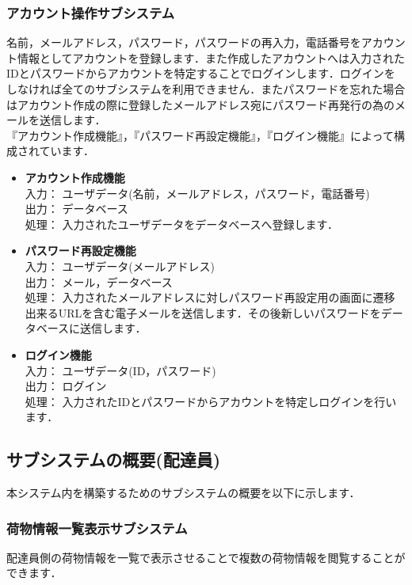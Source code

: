 \documentclass[a4j,titlepage]{jarticle}
\begin{document}
\subsubsection{アカウント操作サブシステム}
名前，メールアドレス，パスワード，パスワードの再入力，電話番号をアカウント情報としてアカウントを登録します．また作成したアカウントへは入力されたIDとパスワードからアカウントを特定することでログインします．ログインをしなければ全てのサブシステムを利用できません．またパスワードを忘れた場合はアカウント作成の際に登録したメールアドレス宛にパスワード再発行の為のメールを送信します． \\
『アカウント作成機能』，『パスワード再設定機能』，『ログイン機能』によって構成されています．

\begin{itemize}
\item \textbf{アカウント作成機能} \\
入力： ユーザデータ(名前，メールアドレス，パスワード，電話番号) \\
出力： データベース \\
処理： 入力されたユーザデータをデータベースへ登録します．
\item \textbf{パスワード再設定機能} \\
入力： ユーザデータ(メールアドレス) \\
出力： メール，データベース \\
処理： 入力されたメールアドレスに対しパスワード再設定用の画面に遷移出来るURLを含む電子メールを送信します．その後新しいパスワードをデータベースに送信します．
\item \textbf{ログイン機能} \\
入力： ユーザデータ(ID，パスワード) \\
出力： ログイン \\
処理： 入力されたIDとパスワードからアカウントを特定しログインを行います．
\end{itemize}

\newpage

\subsection{サブシステムの概要(配達員)}
本システム内を構築するためのサブシステムの概要を以下に示します．

\subsubsection{荷物情報一覧表示サブシステム}
配達員側の荷物情報を一覧で表示させることで複数の荷物情報を閲覧することができます．
\end{document}
